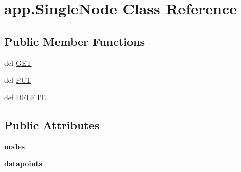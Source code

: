 \hypertarget{classapp_1_1_single_node}{\section{app.\+Single\+Node Class Reference}
\label{classapp_1_1_single_node}
}
\subsection*{Public Member Functions}
\begin{DoxyCompactItemize}
\item 
def \hyperlink{classapp_1_1_single_node_a6ecce82944687fe17cf54147e9b8df11}{G\+E\+T}
\item 
def \hyperlink{classapp_1_1_single_node_a44727ac8995a83af60050941a954b8d3}{P\+U\+T}
\item 
def \hyperlink{classapp_1_1_single_node_a728d66381a64209b4417ecf4086e39f2}{D\+E\+L\+E\+T\+E}
\end{DoxyCompactItemize}
\subsection*{Public Attributes}
\begin{DoxyCompactItemize}
\item 
\hypertarget{classapp_1_1_single_node_a002e045a3821c14b9df23535c7c66260}{{\bfseries nodes}}\label{classapp_1_1_single_node_a002e045a3821c14b9df23535c7c66260}

\item 
\hypertarget{classapp_1_1_single_node_a4821bef740d24eca80d170a61c61ad79}{{\bfseries datapoints}}\label{classapp_1_1_single_node_a4821bef740d24eca80d170a61c61ad79}

\end{DoxyCompactItemize}


